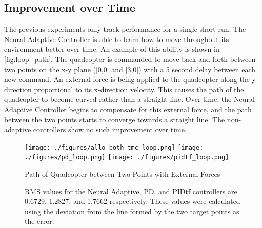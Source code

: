 \documentclass[letterpaper,12pt,titlepage,oneside,final]{book}
\begin{document}



\subsection{Improvement over Time} %

The previous experiments only track performance for a single short run. 
The Neural Adaptive Controller is able to learn how to move throughout its environment better over time.
An example of this ability is shown in \autoref{fig:loop_path}.
The quadcopter is commanded to move back and forth between two points on the x-y plane ([0,0] and [3,0]) with a 5 second delay between each new command.
An external force is being applied to the quadcopter along the y-direction proportional to its x-direction velocity.
This causes the path of the quadcopter to become curved rather than a straight line.
Over time, the Neural Adaptive Controller begins to compensate for this external force, and the path between the two points starts to converge towards a straight line.
The non-adaptive controllers show no such improvement over time.

\begin{figure}
\centering
\texttt{[image: ./figures/allo\_both\_tmc\_loop.png]}
\texttt{[image: ./figures/pd\_loop.png]}
\texttt{[image: ./figures/pidtf\_loop.png]}
\caption{Path of Quadcopter between Two Points with External Forces} %
\label{fig:loop_path}
\captionsetup{singlelinecheck=off,font=footnotesize}
\caption*{
RMS values for the Neural Adaptive, PD, and PIDtf controllers are 0.6729, 1.2827, and 1.7662 respectively. These values were calculated using the deviation from the line formed by the two target points as the error.}
\end{figure}
\end{document}
